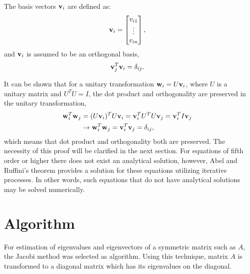 \documentclass[12pt, a4paper, reqno, article]{amsart}
\begin{document}
The basis vectors $\vb{v}_i$ are defined as:
\begin{equation}
\vb{v}_i = \begin{bmatrix}
v_{i1} \\
\vdots \\
v_{in}
\end{bmatrix},
\end{equation}
and $\vb{v}_i$ is assumed to be an orthogonal basis,
\begin{equation}
\vb{v}_j^T\vb{v}_i=\delta_{ij}.
\end{equation}

It can be shown that for a unitary transformation $\vb{w}_i = U\vb{v}_i$, where $U$ is a unitary matrix and $U^TU=I$, the dot product and orthogonality are preserved in the unitary transformation,
\begin{align}
\vb{w}_i^T\vb{w}_j &= (U\vb{v}_i)^T  U\vb{v}_i= \vb{v}_i^TU^T U\vb{v}_j = \vb{v}_i^T I \vb{v}_j \nonumber \\
&\rightarrow \vb{w}_i^T\vb{w}_j = \vb{v}_i^T\vb{v}_j = \delta_{ij},
\end{align}
which means that dot product and orthogonality both are preserved. The necessity of this proof will be clarified in the next section. For equations of fifth order or higher there does not exist an analytical solution, however, Abel and Ruffini's theorem provides a solution for these equations utilizing iterative processes. In other words, such equations that do not have analytical solutions may be solved numerically.

\section{Algorithm}
For estimation of eigenvalues and eigenvectors of a symmetric matrix such as $A$, the Jacobi method was selected as algorithm. Using this technique, matrix $A$ is transformed to a diagonal matrix which has its eigenvalues on the diagonal.
\end{document}
